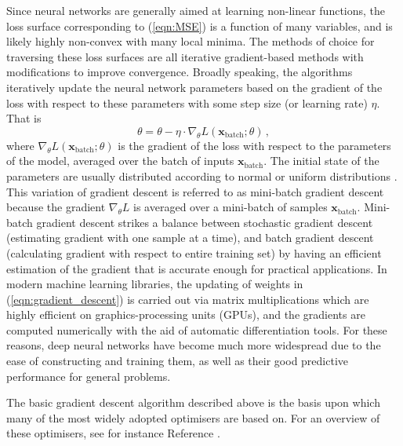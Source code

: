 \documentclass[main.tex]{subfiles}
\begin{document}
    Since neural networks are generally aimed at
    learning non-linear functions, the loss surface
    corresponding to (\ref{eqn:MSE}) is
    a function of many variables, and is likely highly
    non-convex with many local minima.
    The methods of choice for traversing these loss surfaces
    are all iterative gradient-based methods with modifications
    to improve convergence. Broadly speaking, the algorithms
    iteratively update the neural network parameters based on the
    gradient of the loss with respect to these parameters
    with some step size (or learning rate) $\eta$. That is
    \begin{equation}\label{eqn:gradient_descent}
        \theta = \theta - \eta \cdot \nabla_{\theta} L(\mathbf{x}_{\mathrm{batch}}; \theta) \, ,
    \end{equation}
    where $\nabla_{\theta}L(\mathbf{x}_{\mathrm{batch}}; \theta)$ is the
    gradient of the loss with respect to the parameters of the
    model, averaged over the batch of inputs $\mathbf{x}_{\mathrm{batch}}$.
    The initial state of the parameters
    are usually distributed according to normal
    or uniform distributions \cite{pmlr-v9-glorot10a,he_initialiser}.
    This variation of gradient descent is referred to
    as mini-batch gradient descent because the gradient
    $\nabla_{\theta}L$ is averaged over a mini-batch of
    samples $\mathbf{x}_{\mathrm{batch}}$. Mini-batch gradient
    descent strikes a balance between stochastic gradient
    descent (estimating gradient with one sample at a time),
    and batch gradient descent (calculating gradient with
    respect to entire training set) by having an efficient
    estimation of the gradient that is accurate enough
    for practical applications. In modern machine learning
    libraries, the updating of weights in (\ref{eqn:gradient_descent})
    is carried out via matrix multiplications which are
    highly efficient on graphics-processing units (GPUs),
    and the gradients are computed numerically with the aid
    of automatic differentiation tools. For these reasons, deep
    neural networks have become much more widespread due
    to the ease of constructing and training them, as well
    as their good predictive performance for general problems.

    The basic gradient descent algorithm described above
    is the basis upon which many of the most widely
    adopted optimisers \cite{kiefer1952stochastic,hintonrmsprop,Kingma:2014vow}
    are based on. For an overview of these optimisers, see for instance
    Reference \cite{Ruder:2016lil}.
\end{document}
